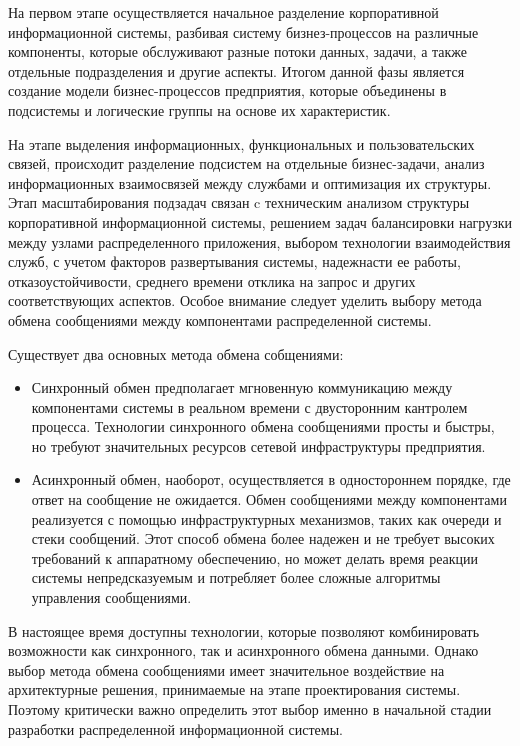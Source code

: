 \documentclass[report, draught]{fefudoc}
\begin{document}
На первом этапе осуществляется начальное разделение корпоративной информационной системы, разбивая систему бизнез-процессов на различные компоненты, которые обслуживают разные потоки данных, задачи, а также отдельные подразделения и другие аспекты. Итогом данной фазы является создание модели бизнес-процессов предприятия, которые объединены в подсистемы и логические группы на основе их характеристик.

На этапе выделения информационных, функциональных и пользовательских связей, происходит разделение подсистем на отдельные бизнес-задачи, анализ информационных взаимосвязей между службами и оптимизация их структуры. Этап масштабирования подзадач связан c техническим анализом структуры корпоративной информационной системы, решением задач балансировки нагрузки между узлами распределенного приложения, выбором технологии взаимодействия служб, с учетом факторов развертывания системы, надежнасти ее работы, отказоустойчивости, среднего времени отклика на запрос и других соответствующих аспектов. Особое внимание следует уделить выбору метода обмена сообщениями между компонентами распределенной системы.

Существует два основных метода обмена собщениями:

\begin{itemize}
\item Синхронный обмен предполагает мгновенную коммуникацию между компонентами системы в реальном времени с двусторонним кантролем процесса. Технологии синхронного обмена сообщениями просты и быстры, но требуют значительных ресурсов сетевой инфраструктуры предприятия.
\item Асинхронный обмен, наоборот, осуществляется в одностороннем порядке, где ответ на сообщение не ожидается. Обмен сообщениями между компонентами реализуется с помощью инфраструктурных механизмов, таких как очереди и стеки сообщений. Этот способ обмена более надежен и не требует высоких требований к аппаратному обеспечению, но может делать время реакции системы непредсказуемым и потребляет более сложные алгоритмы управления сообщениями.
\end{itemize}

В настоящее время доступны технологии, которые позволяют комбинировать возможности как синхронного, так и асинхронного обмена данными. Однако выбор метода обмена сообщениями имеет значительное воздействие на архитектурные решения, принимаемые на этапе проектирования системы. Поэтому критически важно определить этот выбор именно в начальной стадии разработки распределенной информационной системы.
\end{document}
